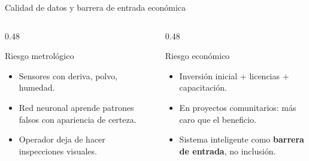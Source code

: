 \documentclass[aspectratio=169, 11pt]{beamer}
\begin{document}
\begin{frame}{Calidad de datos y barrera de entrada econ\'{o}mica}
    \begin{columns}[T]
        \begin{column}{0.48\textwidth}
            \begin{alertblock}{Riesgo metrol\'{o}gico}
                \begin{itemize}
                    \item Sensores con deriva, polvo, humedad.
                    \item Red neuronal aprende patrones falsos con apariencia de certeza.
                    \item Operador deja de hacer inspecciones visuales.
                \end{itemize}
            \end{alertblock}
        \end{column}
        \begin{column}{0.48\textwidth}
            \begin{alertblock}{Riesgo econ\'{o}mico}
                \begin{itemize}
                    \item Inversi\'{o}n inicial + licencias + capacitaci\'{o}n.
                    \item En proyectos comunitarios: m\'{a}s caro que el beneficio.
                    \item Sistema inteligente como \textbf{barrera de entrada}, no inclusi\'{o}n.
                \end{itemize}
            \end{alertblock}
        \end{column}
    \end{columns}
\end{frame}
\end{document}
